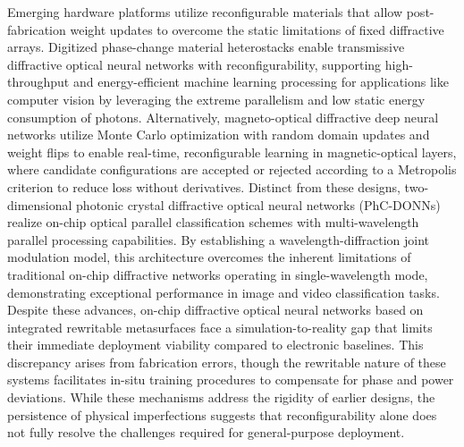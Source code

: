 Emerging hardware platforms utilize reconfigurable materials that allow post-fabrication weight updates to overcome the static limitations of fixed diffractive arrays. Digitized phase-change material heterostacks enable transmissive diffractive optical neural networks with reconfigurability, supporting high-throughput and energy-efficient machine learning processing for applications like computer vision by leveraging the extreme parallelism and low static energy consumption of photons. Alternatively, magneto-optical diffractive deep neural networks utilize Monte Carlo optimization with random domain updates and weight flips to enable real-time, reconfigurable learning in magnetic-optical layers, where candidate configurations are accepted or rejected according to a Metropolis criterion to reduce loss without derivatives. Distinct from these designs, two-dimensional photonic crystal diffractive optical neural networks (PhC-DONNs) realize on-chip optical parallel classification schemes with multi-wavelength parallel processing capabilities. By establishing a wavelength-diffraction joint modulation model, this architecture overcomes the inherent limitations of traditional on-chip diffractive networks operating in single-wavelength mode, demonstrating exceptional performance in image and video classification tasks. Despite these advances, on-chip diffractive optical neural networks based on integrated rewritable metasurfaces face a simulation-to-reality gap that limits their immediate deployment viability compared to electronic baselines. This discrepancy arises from fabrication errors, though the rewritable nature of these systems facilitates in-situ training procedures to compensate for phase and power deviations. While these mechanisms address the rigidity of earlier designs, the persistence of physical imperfections suggests that reconfigurability alone does not fully resolve the challenges required for general-purpose deployment. \citep{doi_10_1002_adpr_202400201_566e9e2f} \citep{doi_10_1051_jeos_2026026_1bd8ff13} \citep{doi_10_1038_s41598_025_19638_8_1b2db1c9} \citep{doi_10_1515_nanoph_2025_0168_86a0f7aa}

